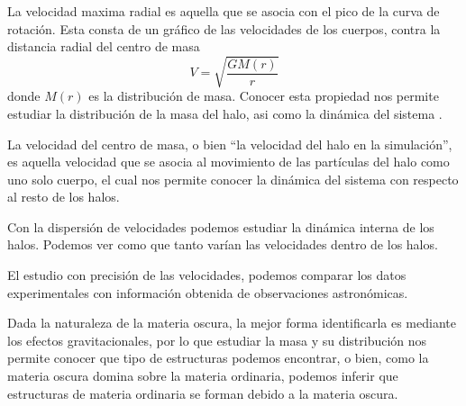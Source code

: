 La velocidad maxima radial es aquella que se asocia con el pico de la curva de rotación. Esta consta de un gráfico de las velocidades de los cuerpos, contra la distancia radial del centro de masa
\begin{equation*}
     V = \sqrt{\frac{GM(r)}{r}} 
\end{equation*}
donde $M(r)$ es la distribución de masa. Conocer esta propiedad nos permite estudiar la distribución de la masa del halo, asi como la dinámica del sistema \cite{2001BookScienceCosmo}.

La velocidad del centro de masa, o bien ``la velocidad del halo en la simulación'', es aquella velocidad que se asocia al movimiento de las partículas del halo como uno solo cuerpo, el cual nos permite conocer la dinámica del sistema con respecto al resto de los halos.

Con la dispersión de velocidades podemos estudiar la dinámica interna de los halos. Podemos ver como que tanto varían las velocidades dentro de los halos.%

El estudio con precisión de las velocidades, podemos comparar los datos experimentales con información obtenida de observaciones astronómicas.

Dada la naturaleza de la materia oscura, la mejor forma identificarla es mediante los efectos gravitacionales, por lo que estudiar la masa y su distribución nos permite conocer que tipo de estructuras podemos encontrar, o bien, como la materia oscura domina sobre la materia ordinaria, podemos inferir que estructuras de materia ordinaria se forman debido a la materia oscura.


